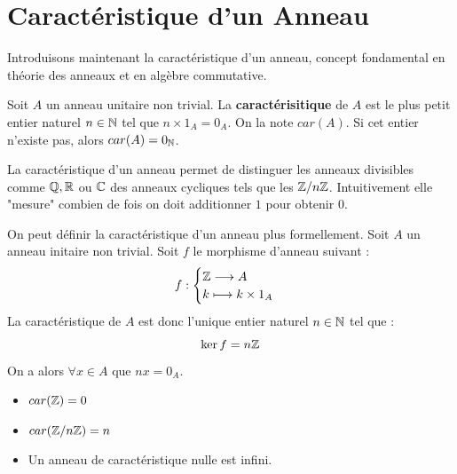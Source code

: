 
\section{Caractéristique d'un Anneau}

Introduisons maintenant la caractéristique d'un anneau, concept fondamental en théorie des anneaux et en algèbre 
commutative. 

\begin{definition}
    Soit $A$ un anneau unitaire non trivial. 
    La \textbf{caractérisitique} de $A$ est le plus petit entier naturel $ n \in \mathbb{N}$ tel que $ n \times 1_A = 0_A$. 
    On la note $car(A)$. 
    Si cet entier n'existe pas, alors $car(A) = 0_{\mathbb{N}}$. 
\end{definition}

\begin{remark}
    La caractéristique d'un anneau permet de distinguer les anneaux divisibles comme $\mathbb{Q},\mathbb{R}$ ou $\mathbb{C}$ des anneaux 
    cycliques tels que les $\mathbb{Z} / n \mathbb{Z}$. 
    Intuitivement elle "mesure" combien de fois on doit additionner $1$ pour obtenir $0$. 
\end{remark}

\begin{proposition}
    On peut définir la caractéristique d'un anneau plus formellement. 
    Soit $A$ un anneau initaire non trivial. Soit $f$ le morphisme d'anneau suivant : 
        \[ f : 
            \begin{cases}
                \mathbb{Z} \longrightarrow A \\ 
                k \longmapsto k \times 1_A 
            \end{cases} \]
    La caractéristique de $A$ est donc l'unique entier naturel $n \in \mathbb{N}$ tel que : 
        \[ \ker f = n \mathbb{Z} \] 
    On a alors $ \forall x \in A$ que $ n x = 0_A$. 
\end{proposition}

\begin{theorem}
    \begin{itemize}
        \item $car (\mathbb{Z}) = 0 $ 
        \item $car (\mathbb{Z} / n \mathbb{Z}) = n $
        \item Un anneau de caractéristique nulle est infini. 
    \end{itemize}
\end{theorem}

